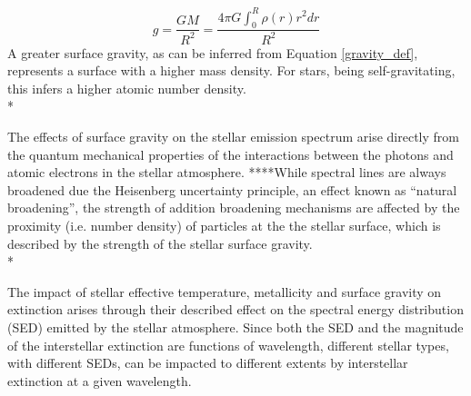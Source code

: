 \documentclass[12pt, a4paper]{report}
\begin{document}
\begin{equation}
g = \frac{GM}{R^{2}} = \frac{4\pi G\int_{0}^{R}\rho(r)r^{2}dr}{R^{2}}
\label{gravity_def}
\end{equation}
A greater surface gravity, as can be inferred from Equation \ref{gravity_def}, represents a surface with a higher mass density. For stars, being self-gravitating, this infers a higher atomic number density.  \\*


The effects of surface gravity on the stellar emission spectrum arise directly from the quantum mechanical properties of the interactions between the photons and atomic electrons in the stellar atmosphere. ****While spectral lines are always broadened due the Heisenberg uncertainty principle, an effect known as ``natural broadening'', the strength of addition broadening mechanisms are affected by the proximity (i.e. number density) of particles at the the stellar surface, which is described by the strength of the stellar surface gravity. \\*


The impact of stellar effective temperature, metallicity and surface gravity on extinction arises through their described effect on the spectral energy distribution (SED) emitted by the stellar atmosphere. Since both the SED and the magnitude of the interstellar extinction are functions of wavelength, different stellar types, with different SEDs, can be impacted to different extents by interstellar extinction at a given wavelength.
\end{document}
